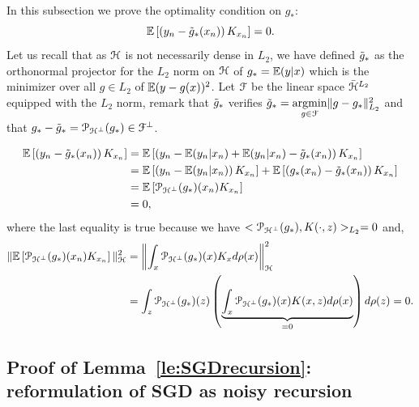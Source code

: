 In this subsection we prove the optimality condition on $g_*$: $${\mathbb E} \left[ \left(y_n - \tilde{g}_*(x_n)\right)K_{x_n}\right] = 0.$$ Let us recall that as ${\mathcal H}$ is not necessarily dense in $L_2$, we have defined $\tilde{g}_*$ as the orthonormal projector for the $L_2$ norm on ${\mathcal H}$ of $g_* = {\mathbb E}(y|x)$ which is the minimizer over all $g \in L_2$ of ${\mathbb E} (y - g(x) )^2$. Let ${\mathcal F}$ be the linear space $ \bar{{\mathcal H}}^{L_2}$ equipped with the $L_2$ norm, remark that $\tilde{g}_*$ verifies $\tilde{g}_* = \underset{g \in {\mathcal F}}{\text{argmin}} \| g-g_*  \|^2_{L_2}$ and that $g_* - \tilde{g}_* = \mathcal{P}_{{\mathcal H}^\perp} (g_*) \in {\mathcal F}^\perp$.  

\begin{align*}
{\mathbb E} \left[ \left(y_n - \tilde{g}_*(x_n)\right)K_{x_n}\right] &= {\mathbb E} \left[ \left(y_n - {\mathbb E}(y_n|x_n) + {\mathbb E}(y_n|x_n) - \tilde{g}_*(x_n)\right)K_{x_n}\right] \\
&= {\mathbb E} \left[ \left(y_n - {\mathbb E}(y_n|x_n)\right)K_{x_n}\right] + {\mathbb E} \left[ \left(g_*(x_n) - \tilde{g}_*(x_n)\right)K_{x_n}\right] \\
&= {\mathbb E} \left[\mathcal{P}_{{\mathcal H}^\perp} (g_*)(x_n)K_{x_n}\right] \\
&=0,
\end{align*}
%
where the last equality is true because we have $<\mathcal{P}_{{\mathcal H}^\perp} (g_*) , K(\cdot,z) >_{L_2} = 0$ and,
\begin{align*}
\|{\mathbb E} \left[\mathcal{P}_{{\mathcal H}^\perp} (g_*)(x_n)K_{x_n}\right]\|^2_{\mathcal H} &= \left\| \int_x \mathcal{P}_{{\mathcal H}^\perp} (g_*)(x)K_x d \rho(x) \right\|^2_{\mathcal H}  \\
&= \int_z \mathcal{P}_{{\mathcal H}^\perp} (g_*)(z) \left(\underbrace{\int_x \mathcal{P}_{{\mathcal H}^\perp} (g_*)(x)  K(x,z)  d \rho(x)}_{ = 0 }\right) d \rho(z) = 0.
\end{align*}

\subsection{Proof of Lemma~\ref{le:SGDrecursion}: reformulation of SGD as noisy recursion}
\label{ap:SGDreformulation}


